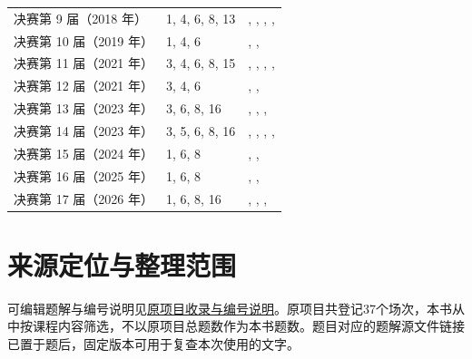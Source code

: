 \documentclass[UTF8,12pt,a4paper,fontset=fandol]{ctexart}
\begin{document}
\begin{longtable}{p{}p{}p{}}
决赛第 9 届（2018 年） & 1, 4, 6, 8, 13 & \pageref{ex:fin09-hi:1}, \pageref{ex:fin09-hi:4}, \pageref{ex:fin09-hi:6}, \pageref{ex:fin09-lo:8}, \pageref{ex:fin09-hi:11}\\

决赛第 10 届（2019 年） & 1, 4, 6 & \pageref{ex:fin10-hi:1}, \pageref{ex:fin10-hi:4}, \pageref{ex:fin10-hi:6}\\

决赛第 11 届（2021 年） & 3, 4, 6, 8, 15 & \pageref{ex:fin11-high:3}, \pageref{ex:fin11-high:4}, \pageref{ex:fin11-high:6}, \pageref{ex:fin11-low:8}, \pageref{ex:fin11-high:13}\\

决赛第 12 届（2021 年） & 3, 4, 6 & \pageref{ex:fin12-high:3}, \pageref{ex:fin12-high:4}, \pageref{ex:fin12-high:6}\\

决赛第 13 届（2023 年） & 3, 6, 8, 16 & \pageref{ex:fin13-high:3}, \pageref{ex:fin13-high:6}, \pageref{ex:fin13-low:8}, \pageref{ex:fin13-high:13}\\

决赛第 14 届（2023 年） & 3, 5, 6, 8, 16 & \pageref{ex:fin14-high:3}, \pageref{ex:fin14-high:5}, \pageref{ex:fin14-high:6}, \pageref{ex:fin14-low:8}, \pageref{ex:fin14-high:13}\\

决赛第 15 届（2024 年） & 1, 6, 8 & \pageref{ex:fin15-high:1}, \pageref{ex:fin15-high:6}, \pageref{ex:fin15-low:8}\\

决赛第 16 届（2025 年） & 1, 6, 8 & \pageref{ex:fin16-high:1}, \pageref{ex:fin16-high:6}, \pageref{ex:fin16-low:8}\\

决赛第 17 届（2026 年） & 1, 6, 8, 16 & \pageref{ex:fin17-high:1}, \pageref{ex:fin17-high:6}, \pageref{ex:fin17-low:6}, \pageref{ex:fin17-high:13}\\

\bottomrule\end{longtable}

\section{来源定位与整理范围}

可编辑题解与编号说明见\href{https://github.com/lzxcr/cmc-mathematics/blob/64916fa1fdbc3e444a652eca204d5669058ee321/docs/COVERAGE.md}{原项目收录与编号说明}。原项目共登记37个场次，本书从中按课程内容筛选，不以原项目总题数作为本书题数。题目对应的题解源文件链接已置于题后，固定版本可用于复查本次使用的文字。
\end{document}
